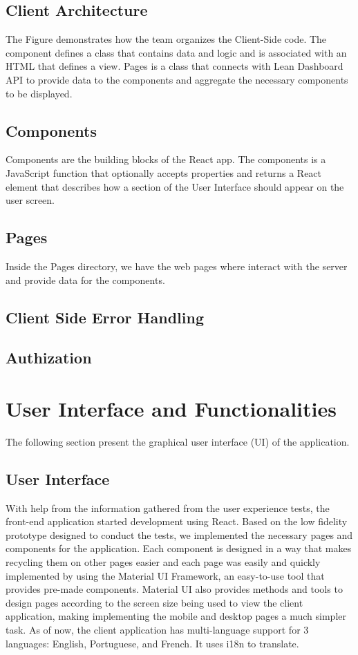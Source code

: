 \documentclass[a4paper,twoside,10pt]{report}
\begin{document}
\section{Client Architecture}
 The Figure demonstrates how the team organizes the Client-Side code. 
 \newline
The component defines a class that contains data and logic and is associated with an HTML that defines a view.
\newline
Pages is a class that connects with Lean Dashboard API to provide data to the components and aggregate the necessary components to be displayed. 
\section{Components}
Components are the building blocks of the React app. The components is a JavaScript function that optionally accepts properties and returns a React element that describes how a section of the User Interface should appear on the user screen. 
\section{Pages}
Inside the Pages directory, we have the web pages where interact with the server and provide data for the components.  
\section{Client Side Error Handling}
\section{Authization}
\chapter{User Interface and Functionalities}
The following section present the graphical user interface (UI) of the application.
\section{User Interface}
With help from the information gathered from the user experience tests, the front-end application started development using React.
\newline
Based on the low fidelity prototype designed to conduct the tests, we implemented the necessary pages and components for the application.
\newline
Each component is designed in a way that makes recycling them on other pages easier and each page was easily and quickly implemented by using the Material UI Framework, an easy-to-use tool that provides pre-made components.
Material UI also provides methods and tools to design pages according to the screen size being used to view the client application, making implementing the mobile and desktop pages a much simpler task.
\newline
As of now, the client application has multi-language support for 3 languages: English, Portuguese, and French. It uses i18n to translate.
 
\end{document}
